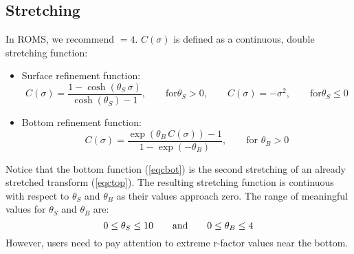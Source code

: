 \subsection{Stretching}
In ROMS, we recommend $ = 4$. $C(\sigma)$ is defined as
a continuous, double stretching function: 
\begin{itemize}
   \item Surface refinement function: 
\begin{equation}
C(\sigma) = \frac{1 -
\cosh(\theta_S \, \sigma)}{\cosh(\theta_S) - 1}, \qquad  \mbox{for
}\theta_S > 0, \qquad C(\sigma) = -{\sigma}^{2}, \qquad \mbox{for
}\theta_S \le 0
\label{eqctop}
\end{equation}
  \item Bottom refinement function:
\begin{equation}
C(\sigma) = \frac
{\exp(\theta_B\,C(\sigma)) - 1} {1 - \exp(-\theta_B)}, \qquad
\mbox{for }\theta_B > 0
\label{eqcbot}
\end{equation}
\end{itemize}
Notice that the bottom
function (\ref{eqcbot}) is the second stretching of an already
stretched transform (\ref{eqctop}). The resulting stretching
function is continuous with respect to $\theta_S$ and $\theta_B$ as
their values approach zero. The range of meaningful values for
$\theta_S$ and $\theta_B$ are:
$$ 0 \le \theta_S \le 10
\qquad \hbox{and} \qquad 0 \le \theta_B \le 4
$$
However, users need to pay attention to extreme r-factor 
values near the bottom.

